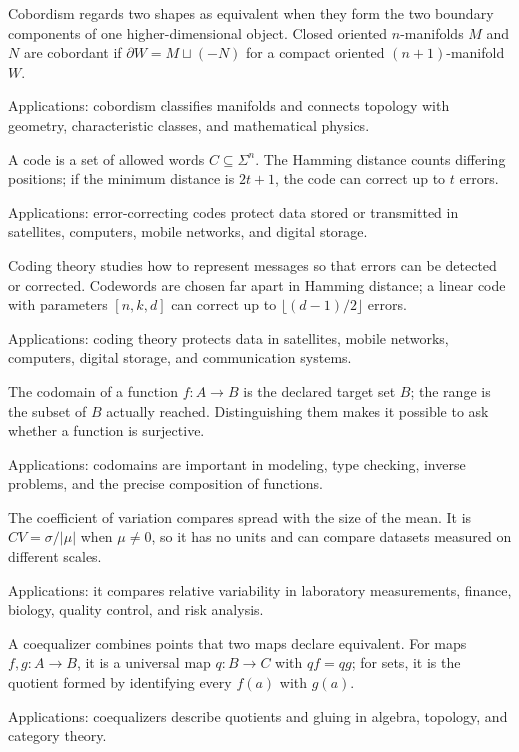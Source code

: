 Cobordism regards two shapes as equivalent when they form the two boundary components of one higher-dimensional object. Closed oriented $n$-manifolds $M$ and $N$ are cobordant if $\partial W=M\sqcup(-N)$ for a compact oriented $(n+1)$-manifold $W$. \par\noindent Applications: cobordism classifies manifolds and connects topology with geometry, characteristic classes, and mathematical physics.

A code is a set of allowed words $C\subseteq\Sigma^n$. The Hamming distance counts differing positions; if the minimum distance is $2t+1$, the code can correct up to $t$ errors. \par\noindent Applications: error-correcting codes protect data stored or transmitted in satellites, computers, mobile networks, and digital storage.

Coding theory studies how to represent messages so that errors can be detected or corrected. Codewords are chosen far apart in Hamming distance; a linear code with parameters $[n,k,d]$ can correct up to $\lfloor(d-1)/2\rfloor$ errors. \par\noindent Applications: coding theory protects data in satellites, mobile networks, computers, digital storage, and communication systems.

The codomain of a function $f:A\to B$ is the declared target set $B$; the range is the subset of $B$ actually reached. Distinguishing them makes it possible to ask whether a function is surjective. \par\noindent Applications: codomains are important in modeling, type checking, inverse problems, and the precise composition of functions.

The coefficient of variation compares spread with the size of the mean. It is $CV=\sigma/|\mu|$ when $\mu\ne0$, so it has no units and can compare datasets measured on different scales. \par\noindent Applications: it compares relative variability in laboratory measurements, finance, biology, quality control, and risk analysis.

A coequalizer combines points that two maps declare equivalent. For maps $f,g:A\to B$, it is a universal map $q:B\to C$ with $qf=qg$; for sets, it is the quotient formed by identifying every $f(a)$ with $g(a)$. \par\noindent Applications: coequalizers describe quotients and gluing in algebra, topology, and category theory.

